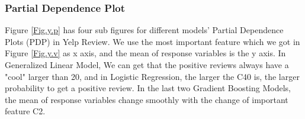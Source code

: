 \documentclass{article}
\begin{document}
\subsubsection{Partial Dependence Plot}
Figure \ref{Fig.y.p} has four sub figures for different models' Partial Dependence Plots (PDP) in Yelp Review. We use the most important feature which we got in Figure \ref{Fig.y.v} as x axis, and the mean of response variables is the y axis. In Generalized Linear Model, We can get that the positive reviews always have a "cool" larger than 20, and in Logistic Regression, the larger the C40 is, the larger probability to get a positive review. In the last two Gradient Boosting Models, the mean of response variables change smoothly with the change of important feature C2.
\begin{figure}[H]
\centering
{}
\end{figure}
\end{document}
